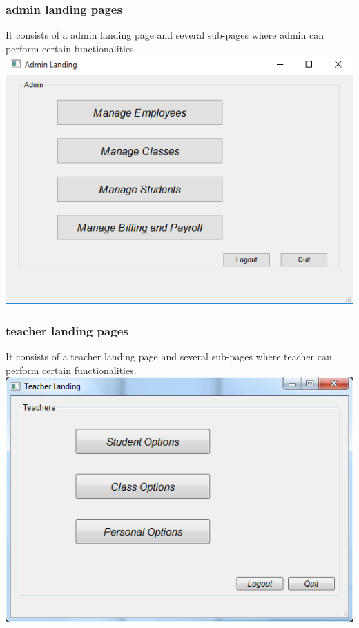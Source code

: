 \subsubsection{admin landing pages} 
It consists of a admin landing page and several sub-pages where admin can perform certain functionalities.\\
\includegraphics[scale=0.7]{pics/admin_landing.png}

\subsubsection{teacher landing pages} 
It consists of a teacher landing page and several sub-pages where teacher can perform certain functionalities.\\
\includegraphics[scale=0.7]{pics/teacher_landing.png}


